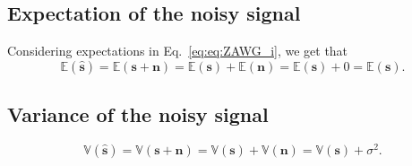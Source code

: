 \subsection{Expectation of the noisy signal}
Considering expectations in Eq.~\ref{eq:eq:ZAWG_i}, we get that
\begin{equation}
  \mathbb{E}(\hat{\mathbf{s}}) = \mathbb{E}(\mathbf{s} + \mathbf{n}) = \mathbb{E}(\mathbf{s}) + \mathbb{E}(\mathbf{n}) = \mathbb{E}(\mathbf{s}) + 0 = \mathbb{E}(\mathbf{s}).
  \label{eq:E_ZAWG}
\end{equation}

\begin{comment}
Considering that $\mathbf{s}$ is a constant (the
clean image is fixed for each adquisition of the image $\hat{\mathbf{s}}$),
\begin{equation}
  \mathbb{E}(\hat{\mathbf{s}}) = \mathbb{E}(\mathbf{s} + \mathbf{n}) = \mathbb{E}(\mathbf{s}) + \mathbb{E}(\mathbf{n}) = \mathbf{s} + \mathbf{0} = \mathbf{s}.
  \label{eq:E_ZAWG}
\end{equation}
This basically implies that if, for example, we take an infinite
number of noisy instances of the same biological specimen, and these
instances are affected by ZAWG noise, then the expected value for each
noisy $i$-th pixel is the clean $i$-th pixel. In other words,
$\hat{\mathbf{s}}$ is an unbiased estimator or $\mathbf{s}$.

Obviously, if Eq.~\ref{eq:E_ZAWG} holds, then
\begin{equation}
  \mathbb{E}(\hat{\mathbf{s}}_i) = \mathbf{s}_i.
  \label{eq:E_ZAWG_i}
\end{equation}
\end{comment}

\subsection{Variance of the noisy signal}

\begin{equation}
  \mathbb{V}(\hat{\mathbf{s}}) = \mathbb{V}(\mathbf{s} + \mathbf{n}) = \mathbb{V}(\mathbf{s}) + \mathbb{V}(\mathbf{n}) = \mathbb{V}(\mathbf{s}) + \sigma^2.
  \label{eq:V_ZAWG}
\end{equation}

\begin{comment}
We have that
\begin{equation}
  \mathbb{V}(\hat{\mathbf{s}}) = \mathbb{V}(\mathbf{s}) + \sigma^2.
  \label{eq:V_ZAWG}
\end{equation}
Notice that the variance of the noisy signal depend on the variance of
the clean signal and the variance of the noise, and there is not a
dependency betweeen both variances. This is a
charactaristic of signal-independent noisy models.
\end{comment}

